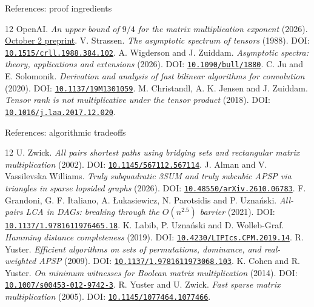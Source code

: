 \documentclass[aspectratio=169,11pt]{beamer}
\newcommand{\doi}[1]{\href{https://doi.org/#1}{\nolinkurl{#1}}}
\begin{document}
\begin{frame}{References: proof ingredients}
  \footnotesize
  \begin{thebibliography}{12}
     OpenAI.
      \emph{An upper bound of $9/4$ for the matrix multiplication exponent} (2026).
      \href{https://github.com/openai/math/tree/main/preprints/Matrix-Multiplication-Nine-Fourths-October-2-2026}{October 2 preprint}.
     V. Strassen.
      \emph{The asymptotic spectrum of tensors} (1988).
      DOI: \doi{10.1515/crll.1988.384.102}.
     A. Wigderson and J. Zuiddam.
      \emph{Asymptotic spectra: theory, applications and extensions} (2026).
      DOI: \doi{10.1090/bull/1880}.
     C. Ju and E. Solomonik.
      \emph{Derivation and analysis of fast bilinear algorithms for convolution} (2020).
      DOI: \doi{10.1137/19M1301059}.
     M. Christandl, A. K. Jensen and J. Zuiddam.
      \emph{Tensor rank is not multiplicative under the tensor product} (2018).
      DOI: \doi{10.1016/j.laa.2017.12.020}.
  \end{thebibliography}
\end{frame}

\begin{frame}{References: algorithmic tradeoffs}
  \footnotesize
  \begin{thebibliography}{12}
     U. Zwick.
      \emph{All pairs shortest paths using bridging sets and rectangular matrix multiplication} (2002).
      DOI: \doi{10.1145/567112.567114}.
     J. Alman and V. Vassilevska Williams.
      \emph{Truly subquadratic 3SUM and truly subcubic APSP via triangles in sparse lopsided graphs} (2026).
      DOI: \doi{10.48550/arXiv.2610.06783}.
     F. Grandoni, G. F. Italiano, A. Łukasiewicz, N. Parotsidis and P. Uznański.
      \emph{All-pairs LCA in DAGs: breaking through the $O(n^{2.5})$ barrier} (2021).
      DOI: \doi{10.1137/1.9781611976465.18}.
     K. Labib, P. Uznański and D. Wolleb-Graf.
      \emph{Hamming distance completeness} (2019).
      DOI: \doi{10.4230/LIPIcs.CPM.2019.14}.
     R. Yuster.
      \emph{Efficient algorithms on sets of permutations, dominance, and real-weighted APSP} (2009).
      DOI: \doi{10.1137/1.9781611973068.103}.
     K. Cohen and R. Yuster.
      \emph{On minimum witnesses for Boolean matrix multiplication} (2014).
      DOI: \doi{10.1007/s00453-012-9742-3}.
     R. Yuster and U. Zwick.
      \emph{Fast sparse matrix multiplication} (2005).
      DOI: \doi{10.1145/1077464.1077466}.
  \end{thebibliography}
\end{frame}
\end{document}
